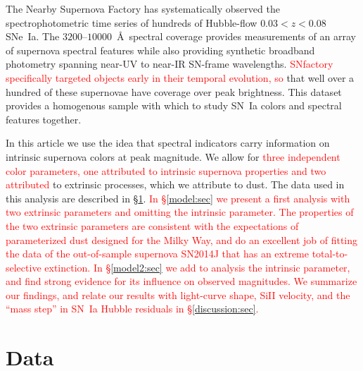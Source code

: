 \documentclass{aastex61}   	%
\begin{document}
The Nearby Supernova Factory \citep[SNfactory;][]{2002SPIE.4836...61A} has systematically observed the
spectrophotometric time series of hundreds of Hubble-flow $0.03<z<0.08$ SNe~Ia.   The $3200$--$10000$~\AA\ spectral coverage
provides measurements of an array of supernova spectral features while also providing synthetic broadband photometry
spanning near-UV to near-IR SN-frame wavelengths.  \textcolor{red}{SNfactory specifically targeted objects
early in their temporal evolution, so} that well over a hundred of these supernovae have  coverage over
peak brightness.  This dataset provides a homogenous sample with which to study SN~Ia colors and spectral features together.

In this article we use the idea that spectral indicators carry information on intrinsic supernova colors at peak magnitude.
We allow for \textcolor{red}{three independent color parameters, one attributed to intrinsic supernova
properties and two  attributed} to
extrinsic processes, which we attribute to dust.  The data used in this analysis are described in \S\ref{data:sec}.  \textcolor{red}{
In \S\ref{model:sec} we present a
first analysis with two extrinsic parameters and omitting the intrinsic parameter.  The properties of the two extrinsic parameters
are consistent with the expectations of parameterized dust designed for the Milky Way, and do an excellent job of fitting the data of the out-of-sample
supernova SN2014J that has an extreme total-to-selective extinction.
In \S\ref{model2:sec} we add to analysis the intrinsic parameter, and find strong evidence for its influence on observed magnitudes.
We summarize our findings, and relate our results with light-curve shape, SiII velocity, and the ``mass step'' in SN~Ia Hubble
residuals in \S\ref{discussion:sec}.}


\section{Data}
\label{data:sec}
\end{document}
